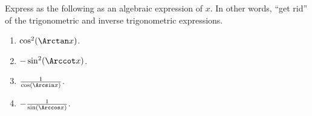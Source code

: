 Express as the following as an algebraic expression of $x$. In other words, ``get rid'' of the trigonometric and inverse trigonometric expressions.
\begin{multicols}{2}
\begin{enumerate}
\item $\cos^2(\Arctan x)$. 
\item $-\sin^2(\Arccot x)$. 
\item $\frac{1}{\cos(\Arcsin x)}$. 
\item $-\frac{1}{\sin(\Arccos x)}$.
\end{enumerate}
\end{multicols}
